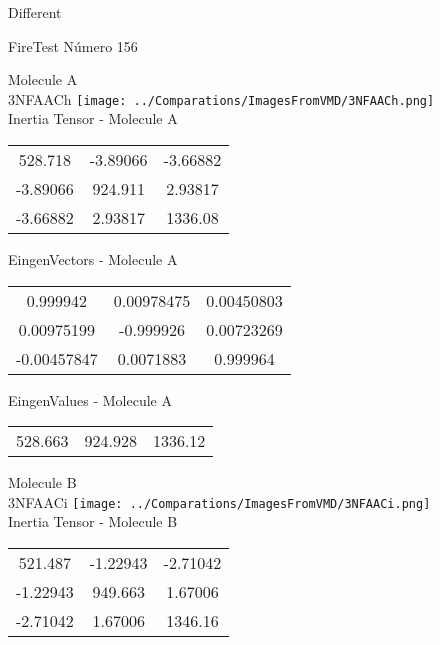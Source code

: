 \begin{center}
\vtab
\vtab
\textcolor{NavyBlue}{\Large Different}
\end{center}

 \newpage

\vtab[-2cm]
\begin{center}
{\large FireTest \tab Número 156}
\end{center}
\begin{multicols}{2}
\begin{center}

Molecule A \\ 
3NFAACh
\texttt{[image: ../Comparations/ImagesFromVMD/3NFAACh.png]}
\\
Inertia Tensor - Molecule A \\
\vtab

\begin{tabular}{|c c c|}
528.718	 & 	-3.89066	 & 	-3.66882	 \\
-3.89066	 & 	924.911	 & 	2.93817	 \\
-3.66882	 & 	2.93817	 & 	1336.08
\end{tabular}

\vtab
 EingenVectors - Molecule A     \\
\vtab
\begin{tabular}{|c c c|}
0.999942	 & 	0.00978475	 & 	0.00450803	 \\
0.00975199	 & 	-0.999926	 & 	0.00723269	 \\
-0.00457847	 & 	0.0071883	 & 	0.999964
\end{tabular}

\vtab
 EingenValues - Molecule A     \\
\vtab
\begin{tabular}{|c c c|}
528.663	 & 	924.928	 & 	1336.12	 \\
\end{tabular}
\columnbreak

Molecule B \\ 
3NFAACi
\texttt{[image: ../Comparations/ImagesFromVMD/3NFAACi.png]}
\\
Inertia Tensor - Molecule B \\
\vtab

\begin{tabular}{|c c c|}
521.487	 & 	-1.22943	 & 	-2.71042	 \\
-1.22943	 & 	949.663	 & 	1.67006	 \\
-2.71042	 & 	1.67006	 & 	1346.16
\end{tabular}


\end{center}
\end{multicols}
